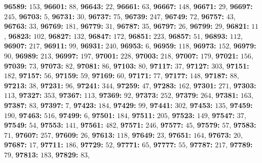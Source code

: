 \textsf{\bfseries 96589:} $153$, \textsf{\bfseries 96601:} $88$, \textsf{\bfseries 96643:} $22$, \textsf{\bfseries 96661:} $63$, \textsf{\bfseries 96667:} $148$, \textsf{\bfseries 96671:} $29$, \textsf{\bfseries 96697:} $245$, \textsf{\bfseries 96703:} $5$, \textsf{\bfseries 96731:} $30$, \textsf{\bfseries 96737:} $75$, \textsf{\bfseries 96739:} $247$, \textsf{\bfseries 96749:} $72$, \textsf{\bfseries 96757:} $43$, \textsf{\bfseries 96763:} $33$, \textsf{\bfseries 96769:} $181$, \textsf{\bfseries 96779:} $31$, \textsf{\bfseries 96787:} $35$, \textsf{\bfseries 96797:} $26$, \textsf{\bfseries 96799:} $29$, \textsf{\bfseries 96821:} $11$, \textsf{\bfseries 96823:} $102$, \textsf{\bfseries 96827:} $132$, \textsf{\bfseries 96847:} $172$, \textsf{\bfseries 96851:} $223$, \textsf{\bfseries 96857:} $51$, \textsf{\bfseries 96893:} $112$, \textsf{\bfseries 96907:} $217$, \textsf{\bfseries 96911:} $99$, \textsf{\bfseries 96931:} $240$, \textsf{\bfseries 96953:} $6$, \textsf{\bfseries 96959:} $118$, \textsf{\bfseries 96973:} $152$, \textsf{\bfseries 96979:} $90$, \textsf{\bfseries 96989:} $213$, \textsf{\bfseries 96997:} $197$, \textsf{\bfseries 97001:} $228$, \textsf{\bfseries 97003:} $218$, \textsf{\bfseries 97007:} $179$, \textsf{\bfseries 97021:} $156$, \textsf{\bfseries 97039:} $73$, \textsf{\bfseries 97073:} $82$, \textsf{\bfseries 97081:} $86$, \textsf{\bfseries 97103:} $80$, \textsf{\bfseries 97117:} $37$, \textsf{\bfseries 97127:} $303$, \textsf{\bfseries 97151:} $182$, \textsf{\bfseries 97157:} $56$, \textsf{\bfseries 97159:} $59$, \textsf{\bfseries 97169:} $60$, \textsf{\bfseries 97171:} $77$, \textsf{\bfseries 97177:} $148$, \textsf{\bfseries 97187:} $88$, \textsf{\bfseries 97213:} $38$, \textsf{\bfseries 97231:} $96$, \textsf{\bfseries 97241:} $344$, \textsf{\bfseries 97259:} $47$, \textsf{\bfseries 97283:} $162$, \textsf{\bfseries 97301:} $271$, \textsf{\bfseries 97303:} $113$, \textsf{\bfseries 97327:} $353$, \textsf{\bfseries 97367:} $113$, \textsf{\bfseries 97369:} $92$, \textsf{\bfseries 97373:} $252$, \textsf{\bfseries 97379:} $264$, \textsf{\bfseries 97381:} $163$, \textsf{\bfseries 97387:} $83$, \textsf{\bfseries 97397:} $7$, \textsf{\bfseries 97423:} $184$, \textsf{\bfseries 97429:} $99$, \textsf{\bfseries 97441:} $302$, \textsf{\bfseries 97453:} $135$, \textsf{\bfseries 97459:} $190$, \textsf{\bfseries 97463:} $516$, \textsf{\bfseries 97499:} $6$, \textsf{\bfseries 97501:} $184$, \textsf{\bfseries 97511:} $205$, \textsf{\bfseries 97523:} $149$, \textsf{\bfseries 97547:} $37$, \textsf{\bfseries 97549:} $54$, \textsf{\bfseries 97553:} $141$, \textsf{\bfseries 97561:} $482$, \textsf{\bfseries 97571:} $246$, \textsf{\bfseries 97577:} $45$, \textsf{\bfseries 97579:} $57$, \textsf{\bfseries 97583:} $71$, \textsf{\bfseries 97607:} $257$, \textsf{\bfseries 97609:} $26$, \textsf{\bfseries 97613:} $118$, \textsf{\bfseries 97649:} $23$, \textsf{\bfseries 97651:} $164$, \textsf{\bfseries 97673:} $20$, \textsf{\bfseries 97687:} $17$, \textsf{\bfseries 97711:} $186$, \textsf{\bfseries 97729:} $52$, \textsf{\bfseries 97771:} $65$, \textsf{\bfseries 97777:} $55$, \textsf{\bfseries 97787:} $217$, \textsf{\bfseries 97789:} $79$, \textsf{\bfseries 97813:} $183$, \textsf{\bfseries 97829:} $83$, 
